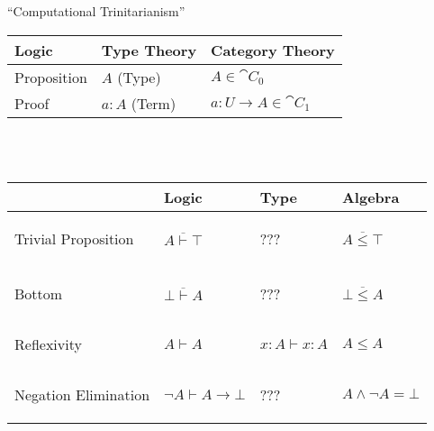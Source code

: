 ``Computational Trinitarianism''
\\
\begin{tabular}{| l | l | l |}
\hline
\textbf{Logic} & \textbf{Type Theory} & \textbf{Category Theory}\\ \hline \hline
Proposition & $A$ (Type) & $A \in \cat{C}_0$ \\ \hline
Proof & $a : A$ (Term) & $a:U \rightarrow A \in \cat{C}_1$ \\
\hline
\end{tabular}
\\
\cite{harper12}
\\
\begin{tabular}{| p{2cm} | p{3cm} | p{4.5cm} | p{3cm} |}
\hline
& \textbf{Logic} & \textbf{Type} & \textbf{Algebra}\\ \hline \hline
Trivial Proposition
  & \begin{center} $\overline{A \vdash \top}$ \end{center}
  & \begin{center} ??? \end{center}
  & \begin{center} $\overline{A \leq \top}$ \end{center} \\ \hline
Bottom
  & \begin{center} $\overline{\bot \vdash A}$ \end{center}
  & \begin{center} ??? \end{center}
  & \begin{center} $\overline{\bot \leq A}$ \end{center} \\ \hline
Reflexivity
  & \begin{center} $A \vdash A$ \end{center}
  & \begin{center} $x : A \vdash x : A$ \end{center}
  & \begin{center} $A \leq A$ \end{center} \\ \hline
Negation Elimination
  & \begin{center} $\neg A \vdash A \rightarrow \bot$ \end{center}
  & \begin{center} ??? \end{center}
  & \begin{center} $A \wedge \neg A = \bot$ \end{center} \\ \hline

\end{tabular}
